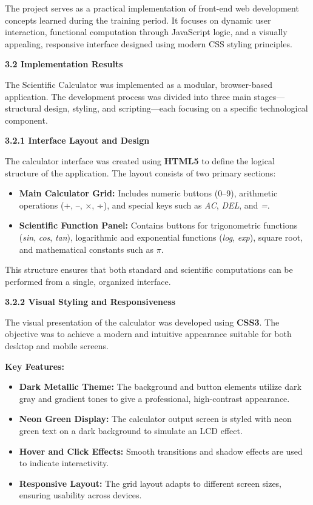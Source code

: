 \documentclass[a4paper,12pt,oneside]{report}
\numberwithin{equation}{chapter}
\numberwithin{figure}{chapter}
\numberwithin{table}{chapter}
\begin{document}
The project serves as a practical implementation of front-end web development concepts learned during the training period. It focuses on dynamic user interaction, functional computation through JavaScript logic, and a visually appealing, responsive interface designed using modern CSS styling principles.

\bigskip
\noindent
\textbf{3.2 Implementation Results}

The Scientific Calculator was implemented as a modular, browser-based application. The development process was divided into three main stages—structural design, styling, and scripting—each focusing on a specific technological component.

\bigskip
\noindent
\textbf{3.2.1 Interface Layout and Design}

The calculator interface was created using \textbf{HTML5} to define the logical structure of the application. The layout consists of two primary sections:
\begin{itemize}
    \item \textbf{Main Calculator Grid:} Includes numeric buttons (0–9), arithmetic operations (+, –, ×, ÷), and special keys such as \textit{AC}, \textit{DEL}, and \textit{=}.
    \item \textbf{Scientific Function Panel:} Contains buttons for trigonometric functions (\textit{sin}, \textit{cos}, \textit{tan}), logarithmic and exponential functions (\textit{log}, \textit{exp}), square root, and mathematical constants such as \textit{$\pi$}.
\end{itemize}

This structure ensures that both standard and scientific computations can be performed from a single, organized interface.

\bigskip
\noindent
\newpage
\textbf{3.2.2 Visual Styling and Responsiveness}

The visual presentation of the calculator was developed using \textbf{CSS3}. The objective was to achieve a modern and intuitive appearance suitable for both desktop and mobile screens. 

\textbf{Key Features:}
\begin{itemize}
    \item \textbf{Dark Metallic Theme:} The background and button elements utilize dark gray and gradient tones to give a professional, high-contrast appearance.
    \item \textbf{Neon Green Display:} The calculator output screen is styled with neon green text on a dark background to simulate an LCD effect.
    \item \textbf{Hover and Click Effects:} Smooth transitions and shadow effects are used to indicate interactivity.
    \item \textbf{Responsive Layout:} The grid layout adapts to different screen sizes, ensuring usability across devices.
\end{itemize}
\end{document}

